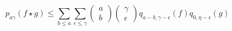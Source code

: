 \begin{equation}\label{eq207:ps}
	p_{a\gamma}(f\star g)\leq \sum_{b\leq a}\sum_{\epsilon\leq \gamma} \left( \begin{array}{c}
	a \\
	b
	\end{array} \right)\left(\begin{array}{c}
	\gamma \\
	\epsilon
	\end{array} \right) q_{a-b,\gamma-\epsilon}(f)q_{0,\eta-\epsilon}(g)
\end{equation}

